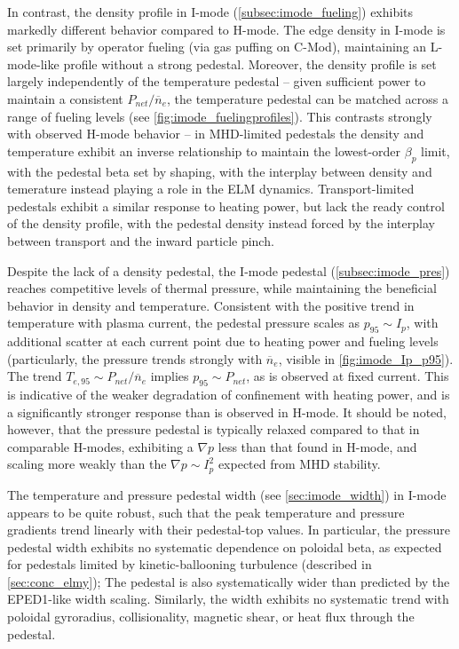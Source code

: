 In contrast, the density profile in I-mode (\cref{subsec:imode_fueling}) exhibits markedly different behavior compared to H-mode.  The edge density in I-mode is set primarily by operator fueling (via gas puffing on C-Mod), maintaining an L-mode-like profile without a strong pedestal.  Moreover, the density profile is set largely independently of the temperature pedestal -- given sufficient power to maintain a consistent $P_{net}/\overline{n}_e$, the temperature pedestal can be matched across a range of fueling levels (see \cref{fig:imode_fuelingprofiles}).  This contrasts strongly with observed H-mode behavior -- in MHD-limited pedestals the density and temperature exhibit an inverse relationship to maintain the lowest-order $\beta_p$ limit, with the pedestal beta set by shaping, with the interplay between density and temerature instead playing a role in the ELM dynamics.  Transport-limited pedestals exhibit a similar response to heating power, but lack the ready control of the density profile, with the pedestal density instead forced by the interplay between transport and the inward particle pinch.

Despite the lack of a density pedestal, the I-mode pedestal (\cref{subsec:imode_pres}) reaches competitive levels of thermal pressure, while maintaining the beneficial behavior in density and temperature.  Consistent with the positive trend in temperature with plasma current, the pedestal pressure scales as $p_{95} \sim I_p$, with additional scatter at each current point due to heating power and fueling levels (particularly, the pressure trends strongly with $\overline{n}_e$, visible in \cref{fig:imode_Ip_p95}).  The trend $T_{e,95} \sim P_{net}/\overline{n}_e$ implies $p_{95} \sim P_{net}$, as is observed at fixed current.  This is indicative of the weaker degradation of confinement with heating power, and is a significantly stronger response than is observed in H-mode.  It should be noted, however, that the pressure pedestal is typically relaxed compared to that in comparable H-modes, exhibiting a $\nabla p$ less than that found in H-mode, and scaling more weakly than the $\nabla p \sim I_p^2$ expected from MHD stability.

The temperature and pressure pedestal width (see \cref{sec:imode_width}) in I-mode appears to be quite robust, such that the peak temperature and pressure gradients trend linearly with their pedestal-top values.  In particular, the pressure pedestal width exhibits no systematic dependence on poloidal beta, as expected for pedestals limited by kinetic-ballooning turbulence (described in \cref{sec:conc_elmy}); The pedestal is also systematically wider than predicted by the EPED1-like width scaling.  Similarly, the width exhibits no systematic trend with poloidal gyroradius, collisionality, magnetic shear, or heat flux through the pedestal.

